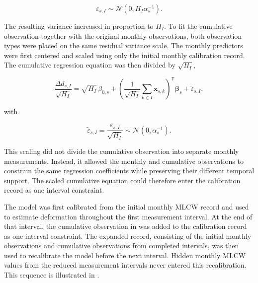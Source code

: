 \begin{equation}
\varepsilon_{s,I}
\sim
\mathcal{N}
\left(
0,
H_I\alpha_s^{-1}
\right).
\label{eq:cumulative_residual_distribution}
\end{equation}

The resulting variance increased in proportion to $H_I$. To fit the cumulative observation together with the original monthly observations, both observation types were placed on the same residual variance scale. The monthly predictors were first centered and scaled using only the initial monthly calibration record. The cumulative regression equation was then divided by $\sqrt{H_I}$,

\begin{equation}
\frac{\Delta d_{s,I}}{\sqrt{H_I}}
=
\sqrt{H_I}\,\beta_{0,s}
+
\left(
\frac{1}{\sqrt{H_I}}
\sum_{k\in I}\boldsymbol{x}_{s,k}
\right)^{\mathsf{T}}
\boldsymbol{\beta}_{s}
+
\widetilde{\varepsilon}_{s,I},
\label{eq:scaled_cumulative_deformation_model}
\end{equation}

with

\begin{equation}
\widetilde{\varepsilon}_{s,I}
=
\frac{\varepsilon_{s,I}}{\sqrt{H_I}}
\sim
\mathcal{N}
\left(
0,
\alpha_s^{-1}
\right).
\label{eq:scaled_cumulative_residual}
\end{equation}

This scaling did not divide the cumulative observation into separate monthly measurements. Instead, it allowed the monthly and cumulative observations to constrain the same regression coefficients while preserving their different temporal support. The scaled cumulative equation could therefore enter the calibration record as one interval constraint.

The model was first calibrated from the initial monthly MLCW record and used to estimate deformation throughout the first measurement interval. At the end of that interval, the cumulative observation in  was added to the calibration record as one interval constraint. The expanded record, consisting of the initial monthly observations and cumulative observations from completed intervals, was then used to recalibrate the model before the next interval. Hidden monthly MLCW values from the reduced measurement intervals never entered this recalibration. This sequence is illustrated in .

